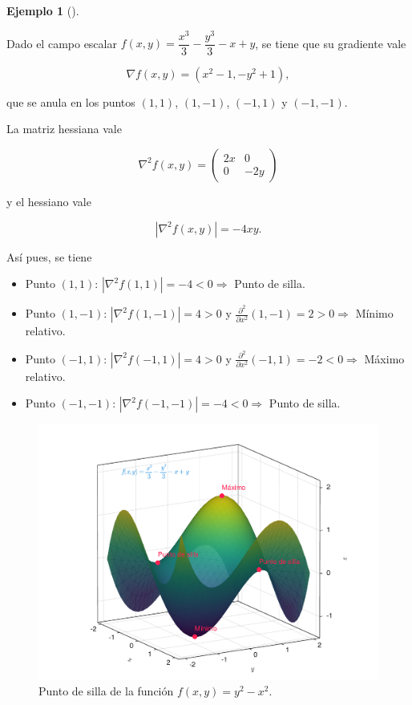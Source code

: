 \documentclass[
  a4paper,
]{scrreport}
\providecommand{\tightlist}{%
  \setlength{\itemsep}{0pt}\setlength{\parskip}{0pt}}\usepackage{longtable,booktabs,array}
\theoremstyle{definition}
\theoremstyle{plain}
\theoremstyle{plain}
\theoremstyle{definition}
\theoremstyle{definition}
\newtheorem{example}{Ejemplo}[chapter]
\theoremstyle{plain}
\theoremstyle{remark}
\begin{document}
\begin{example}[]\protect\hypertarget{exm-extremos-relativos-2}{}\label{exm-extremos-relativos-2}

Dado el campo escalar \(f(x,y)=\dfrac{x^3}{3}-\dfrac{y^3}{3}-x+y\), se
tiene que su gradiente vale

\[
\nabla f(x,y)= (x^2-1,-y^2+1),
\]

que se anula en los puntos \((1,1)\), \((1,-1)\), \((-1,1)\) y
\((-1,-1)\).

La matriz hessiana vale

\[
\nabla^2f(x,y) = \left(
\begin{array}{cc}
2x & 0\\
0 & -2y
\end{array}
\right)
\]

y el hessiano vale

\[
|\nabla^2 f(x,y)| = -4xy.
\]

Así pues, se tiene

\begin{itemize}
\tightlist
\item
  Punto \((1,1)\): \(|\nabla^2 f(1,1)| = -4 < 0 \Rightarrow\) Punto de
  silla.
\item
  Punto \((1,-1)\): \(|\nabla^2 f(1,-1)|=4>0\) y
  \(\frac{\partial^2}{\partial x^2}(1,-1)=2>0 \Rightarrow\) Mínimo
  relativo.
\item
  Punto \((-1,1)\): \(|\nabla^2 f(-1,1)|=4>0\) y
  \(\frac{\partial^2}{\partial x^2}(-1,1)=-2<0 \Rightarrow\) Máximo
  relativo.
\item
  Punto \((-1,-1)\): \(|\nabla^2 f(-1,-1)|=-4<0 \Rightarrow\) Punto de
  silla.
\end{itemize}

\begin{figure}

{\centering \includegraphics{img/derivadas-funciones-varias-variables/extremos.pdf}

}

\caption{Punto de silla de la función \(f(x,y)=y^2-x^2\).}

\end{figure}

\end{example}
\end{document}
